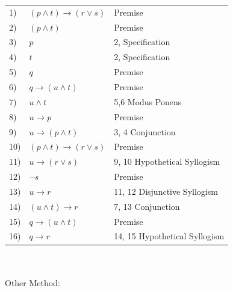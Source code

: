 \documentclass{article} %
\begin{document}
    \begin{tabular}{ l l l }
        1) & $(p \land t) \rightarrow (r \lor s)$ & Premise \\

        2) & $(p \land t)$                        & Premise \\

        3) & $p$                                  & 2, Specification \\

        4) & $t$                                  & 2, Specification \\

        5) & $q$                                  & Premise \\

        6) & $q \rightarrow ( u \land t)$         & Premise \\

        7) & $u \land t$                          & 5,6 Modus Ponens \\

        8) & $u \rightarrow p$                    & Premise \\

        9) & $u \rightarrow (p \land t)$          & 3, 4 Conjunction \\ 

        10) & $(p \land t) \rightarrow (r \lor s)$ & Premise \\ 

        11) & $u \rightarrow (r \lor s)$           & 9, 10 Hypothetical Syllogism \\ 

        12) & $\neg s$                             & Premise \\  

        13) & $u \rightarrow r$                   & 11, 12 Disjunctive Syllogism \\ 

        14) & $(u \land t) \rightarrow r$         & 7, 13 Conjunction \\

        15) & $q \rightarrow (u \land t)$         & Premise \\ 

        16) & $q \rightarrow r$                   & 14, 15 Hypothetical Syllogism \\       
    \end{tabular}
    \\\\
    Other Method:
\end{document}
